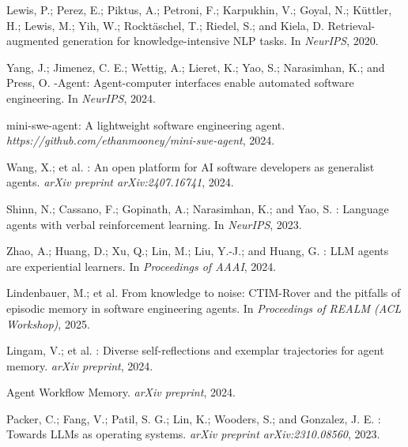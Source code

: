 \documentclass[UTF8,twocolumn]{ctexart}
\begin{document}
\begin{thebibliography}{}

Lewis, P.; Perez, E.; Piktus, A.; Petroni, F.; Karpukhin, V.; Goyal, N.; K\"{u}ttler, H.; Lewis, M.; Yih, W.; Rockt\"{a}schel, T.; Riedel, S.; and Kiela, D.
\newblock Retrieval-augmented generation for knowledge-intensive {NLP} tasks.
\newblock In \emph{NeurIPS}, 2020.

Yang, J.; Jimenez, C. E.; Wettig, A.; Lieret, K.; Yao, S.; Narasimhan, K.; and Press, O.
-Agent: Agent-computer interfaces enable automated software engineering.
\newblock In \emph{NeurIPS}, 2024.

mini-swe-agent: A lightweight software engineering agent.
\newblock \emph{https://github.com/ethanmooney/mini-swe-agent}, 2024.

Wang, X.; et al.
: An open platform for {AI} software developers as generalist agents.
\newblock \emph{arXiv preprint arXiv:2407.16741}, 2024.

Shinn, N.; Cassano, F.; Gopinath, A.; Narasimhan, K.; and Yao, S.
: Language agents with verbal reinforcement learning.
\newblock In \emph{NeurIPS}, 2023.

Zhao, A.; Huang, D.; Xu, Q.; Lin, M.; Liu, Y.-J.; and Huang, G.
: {LLM} agents are experiential learners.
\newblock In \emph{Proceedings of AAAI}, 2024.

Lindenbauer, M.; et al.
\newblock From knowledge to noise: {CTIM}-Rover and the pitfalls of episodic memory in software engineering agents.
\newblock In \emph{Proceedings of REALM (ACL Workshop)}, 2025.

Lingam, V.; et al.
: Diverse self-reflections and exemplar trajectories for agent memory.
\newblock \emph{arXiv preprint}, 2024.

Agent Workflow Memory.
\newblock \emph{arXiv preprint}, 2024.

Packer, C.; Fang, V.; Patil, S. G.; Lin, K.; Wooders, S.; and Gonzalez, J. E.
: Towards {LLMs} as operating systems.
\newblock \emph{arXiv preprint arXiv:2310.08560}, 2023.


\end{thebibliography}
\end{document}
